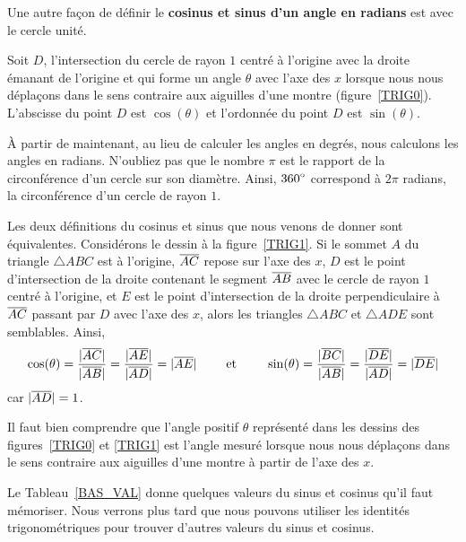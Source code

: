 {

Une autre façon de définir le
{\bfseries cosinus et sinus d'un angle en radians} est avec le cercle
unité.

\begin{defn}
Soit $D$, l'intersection du cercle de rayon $1$ centré à l'origine
avec la droite émanant de l'origine et qui forme un angle $\theta$
avec l'axe des $x$ lorsque nous nous déplaçons dans le sens contraire aux
aiguilles d'une montre (figure~\ref{TRIG0}).  L'abscisse du
point $D$ est $\cos(\theta)$ et l'ordonnée du point $D$
est $\sin(\theta)$.
\end{defn}


À partir de maintenant, au lieu de calculer les angles en degrés, nous
calculons les angles en radians.  N'oubliez pas que le nombre $\pi$
est le rapport de la circonférence d'un cercle sur son diamètre.
Ainsi,  $\displaystyle 360^\circ$ correspond à $2\pi$ radians, la circonférence d'un
cercle de rayon $1$.

Les deux définitions du cosinus et sinus que nous venons de donner
sont équivalentes.  Considérons le dessin à la figure~\ref{TRIG1}.
Si le sommet $A$ du triangle $\triangle ABC$ est à l'origine,
$\overline{AC}$ repose sur l'axe des $x$, $D$ est le point d'intersection
de la droite contenant le segment $\overline{AB}$ avec le cercle de rayon
$1$ centré à l'origine, et $E$ est le point d'intersection de la
droite perpendiculaire à $\overline{AC}$ passant par $D$ avec l'axe des
$x$, alors les triangles $\triangle ABC$ et $\triangle ADE$ sont
semblables.  Ainsi,
\[
\cos(\theta) = \frac{|\overline{AC}|}{|\overline{AB}|} = \frac{|\overline{AE}|}{|\overline{AD}|} =
|\overline{AE}|
\qquad \text{ et } \qquad
\sin(\theta) = \frac{|\overline{BC}|}{|\overline{AB}|} = \frac{|\overline{DE}|}{|\overline{AD}|} =
|\overline{DE}|
\]
car $|\overline{AD}|=1$.

Il faut bien comprendre que l'angle positif $\theta$ représenté dans les
dessins des figures~\ref{TRIG0} et \ref{TRIG1} est l'angle mesuré lorsque nous
nous déplaçons dans le sens contraire aux aiguilles d'une montre à
partir de l'axe des $x$.

Le Tableau~\ref{BAS_VAL} donne quelques valeurs du sinus et cosinus
qu'il faut mémoriser.  Nous verrons plus tard que nous pouvons
utiliser les identités trigonométriques pour trouver d'autres valeurs
du sinus et cosinus.

}
